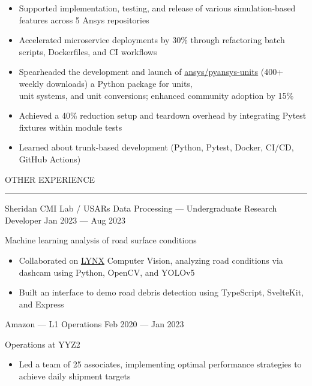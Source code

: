 \documentclass[9pt]{extarticle}
\begin{document}
\begin{adjustwidth}{14pt}{14pt}
	\begin{itemize}[topsep=0pt]
		\item Supported implementation, testing, and release of various simulation-based features across \textcolor{imptextblack}{5} Ansys repositories
		\item Accelerated microservice deployments by \textcolor{imptextblack}{30\%} through refactoring batch scripts, Dockerfiles, and CI workflows
		\item Spearheaded the development and launch of \href{https://github.com/ansys/pyansys-units}{ansys/pyansys-units} (\textcolor{imptextblack}{400+} weekly downloads) a Python package for units, \\
			unit systems, and unit conversions; enhanced community adoption by \textcolor{imptextblack}{15\%}
		\item Achieved a \textcolor{imptextblack}{40\%} reduction setup and teardown overhead by integrating Pytest fixtures within module tests
		\item Learned about \textcolor{imptextblack}{trunk-based} development (Python, Pytest, Docker, CI/CD, GitHub Actions)
	\end{itemize}
\end{adjustwidth}

\vspace{5pt}

\begin{adjustwidth}{4pt}{4pt} OTHER EXPERIENCE \end{adjustwidth}
\rule[8pt]{\linewidth}{0.4pt}

\begin{adjustwidth}{14pt}{14pt}
	\vspace{-10pt}

	\textcolor{imptextblack}{Sheridan CMI Lab / USARs Data Processing — Undergraduate Research Developer} \hfill Jan 2023 — Aug 2023
	
	Machine learning analysis of road surface conditions
	
	\begin{itemize}[topsep=0pt]
		\item Collaborated on \href{https://github.com/Lynx-Data-Processing}{LYNX} Computer Vision, analyzing road conditions via dashcam using Python, OpenCV, and YOLOv5
		\item Built an interface to demo road debris detection using TypeScript, SvelteKit, and Express
	\end{itemize}
	
	\vspace{5pt}
	\textcolor{imptextblack}{Amazon — L1 Operations} \hfill Feb 2020 — Jan 2023
	
	Operations at YYZ2
	
	\begin{itemize}[topsep=0pt]
		\item Led a team of \textcolor{imptextblack}{25} associates, implementing optimal performance strategies to achieve daily shipment targets
	\end{itemize}
\end{adjustwidth}
\end{document}
